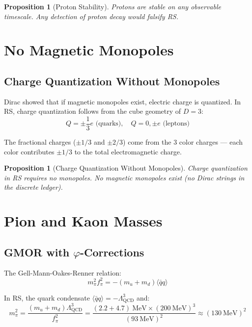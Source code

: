 \documentclass[12pt,a4paper]{article}
\newtheorem{proposition}[theorem]{Proposition}
\theoremstyle{definition}
\theoremstyle{remark}
\begin{document}
\begin{proposition}[Proton Stability]
Protons are stable on any observable timescale. 
Any detection of proton decay would falsify RS.
\end{proposition}

\section{No Magnetic Monopoles}

\subsection{Charge Quantization Without Monopoles}

Dirac showed that if magnetic monopoles exist, electric charge is quantized.
In RS, charge quantization follows from the cube geometry of $D = 3$:
\begin{equation}
Q = \pm\frac{1}{3} e \text{ (quarks)}, \quad Q = 0, \pm e \text{ (leptons)}
\end{equation}

The fractional charges ($\pm 1/3$ and $\pm 2/3$) come from the 3 color charges — 
each color contributes $\pm 1/3$ to the total electromagnetic charge.

\begin{proposition}[Charge Quantization Without Monopoles]
Charge quantization in RS requires no monopoles.
No magnetic monopoles exist (no Dirac strings in the discrete ledger).
\end{proposition}

\section{Pion and Kaon Masses}

\subsection{GMOR with $\varphi$-Corrections}

The Gell-Mann-Oakes-Renner relation:
\begin{equation}
m_\pi^2 f_\pi^2 = -(m_u + m_d)\langle\bar{q}q\rangle
\end{equation}

In RS, the quark condensate $\langle\bar{q}q\rangle = -\Lambda_\mathrm{QCD}^3$ and:
\begin{equation}
m_\pi^2 = \frac{(m_u + m_d)\Lambda_\mathrm{QCD}^3}{f_\pi^2} 
= \frac{(2.2 + 4.7)~\mathrm{MeV} \times (200~\mathrm{MeV})^3}{(93~\mathrm{MeV})^2}
\approx (130~\mathrm{MeV})^2
\end{equation}
\end{document}

